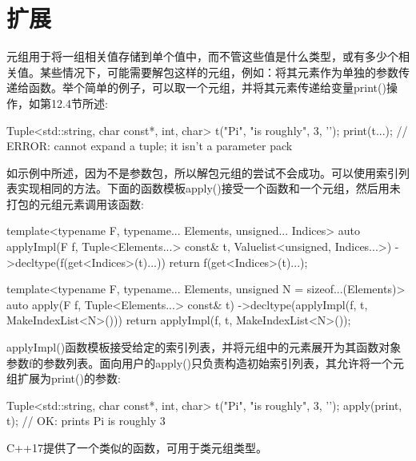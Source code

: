 \section{扩展}
元组用于将一组相关值存储到单个值中，而不管这些值是什么类型，或有多少个相关值。某些情况下，可能需要解包这样的元组，例如：将其元素作为单独的参数传递给函数。举个简单的例子，可以取一个元组，并将其元素传递给变量print()操作，如第12.4节所述:

\begin{cpp}
Tuple<std::string, char const*, int, char> t("Pi", "is roughly",
3, ’\n’);
print(t...); // ERROR: cannot expand a tuple; it isn’t a parameter pack
\end{cpp}

如示例中所述，因为不是参数包，所以解包元组的尝试不会成功。可以使用索引列表实现相同的方法。下面的函数模板apply()接受一个函数和一个元组，然后用未打包的元组元素调用该函数:

\begin{cpp}
template<typename F, typename... Elements, unsigned... Indices>
auto applyImpl(F f, Tuple<Elements...> const& t,
					Valuelist<unsigned, Indices...>)
	->decltype(f(get<Indices>(t)...))
{
	return f(get<Indices>(t)...);
}

template<typename F, typename... Elements,
		unsigned N = sizeof...(Elements)>
auto apply(F f, Tuple<Elements...> const& t)
	->decltype(applyImpl(f, t, MakeIndexList<N>()))
{
	return applyImpl(f, t, MakeIndexList<N>());
}
\end{cpp}

applyImpl()函数模板接受给定的索引列表，并将元组中的元素展开为其函数对象参数f的参数列表。面向用户的apply()只负责构造初始索引列表，其允许将一个元组扩展为print()的参数:

\begin{cpp}
Tuple<std::string, char const*, int, char> t("Pi", "is roughly",
												3, ’\n’);
apply(print, t); // OK: prints Pi is roughly 3
\end{cpp}

C++17提供了一个类似的函数，可用于类元组类型。






































